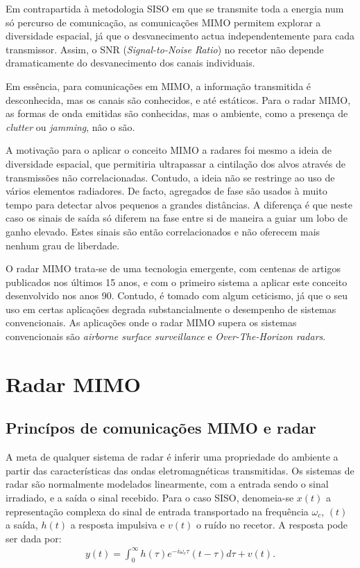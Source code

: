 \documentclass[purist,portuguese]{ist-report}
\begin{document}
Em contrapartida à metodologia SISO em que se transmite toda a energia num só percurso de comunicação, as comunicações MIMO permitem explorar a diversidade espacial, já que o desvanecimento actua independentemente para cada transmissor.
Assim, o SNR (\textit{Signal-to-Noise Ratio}) no recetor não depende dramaticamente do desvanecimento dos canais individuais.

Em essência, para comunicações em MIMO, a informação transmitida é desconhecida, mas os canais são conhecidos, e até estáticos. Para o radar MIMO, as formas de onda emitidas são conhecidas, mas o ambiente, como a presença de \textit{clutter} ou \textit{jamming}, não o são.

A motivação para o aplicar o conceito MIMO a radares foi mesmo a ideia de diversidade espacial, que permitiria ultrapassar a cintilação dos alvos através de transmissões não correlacionadas.
Contudo, a ideia não se restringe ao uso de vários elementos radiadores.
De facto, agregados de fase  são usados à muito tempo para detectar alvos pequenos a grandes distâncias.
A diferença é que neste caso os sinais de saída só diferem na fase entre si de maneira a guiar um lobo de ganho elevado. 
Estes sinais são então correlacionados e não oferecem mais nenhum grau de liberdade.


O radar MIMO trata-se de uma tecnologia emergente, com centenas de artigos publicados nos últimos 15 anos, e com o primeiro sistema a aplicar este conceito desenvolvido nos anos 90.
Contudo, é tomado com algum ceticismo, já que o seu uso em certas aplicações degrada substancialmente o desempenho de sistemas convencionais.
As aplicações onde o radar MIMO supera os sistemas convencionais são \textit{airborne surface surveillance} e \textit{Over-The-Horizon radars}.

\section{Radar MIMO}

\subsection{Princípos de comunicações MIMO e radar}

A meta de qualquer sistema de radar é inferir uma propriedade do ambiente a partir das características das ondas eletromagnéticas transmitidas.
Os sistemas de radar são normalmente modelados linearmente, com a entrada sendo o sinal irradiado, e a saída o sinal recebido. 
Para o caso SISO, denomeia-se $x(t)$ a representação complexa do sinal de entrada transportado na frequência $\omega_c$, $(t)$ a saída, $h(t)$ a resposta impulsiva e $v(t)$ o ruído no recetor.
A resposta pode ser dada por:
\begin{align}
  y(t) = \int_0^\infty h(\tau)e^{-i\omega_c\tau}(t-\tau)d\tau + v(t).
  \label{eq:linearsiso}
\end{align}
\end{document}

